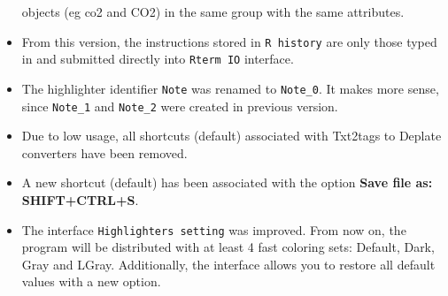 \begin{itemize}
    objects (eg co2 and CO2) in the same group with the same attributes.
  \item From this version, the instructions stored in \texttt{R history} are only those typed in and submitted directly into \texttt{Rterm IO} interface.
  \item The highlighter identifier \texttt{Note} was renamed to \texttt{Note\_0}. It makes more sense, since \texttt{Note\_1} and \texttt{Note\_2} were created
    in previous version.
  \item Due to low usage, all shortcuts (default) associated with Txt2tags to Deplate converters have been removed.
  \item A new shortcut (default) has been associated with the option \textbf{Save file as: SHIFT+CTRL+S}.
  \item The interface \texttt{Highlighters setting} was improved. From now on, the program will be distributed with at least 4 fast coloring sets:
    Default, Dark, Gray and LGray. Additionally, the interface allows you to restore all default values with a new option.
\end{itemize}
